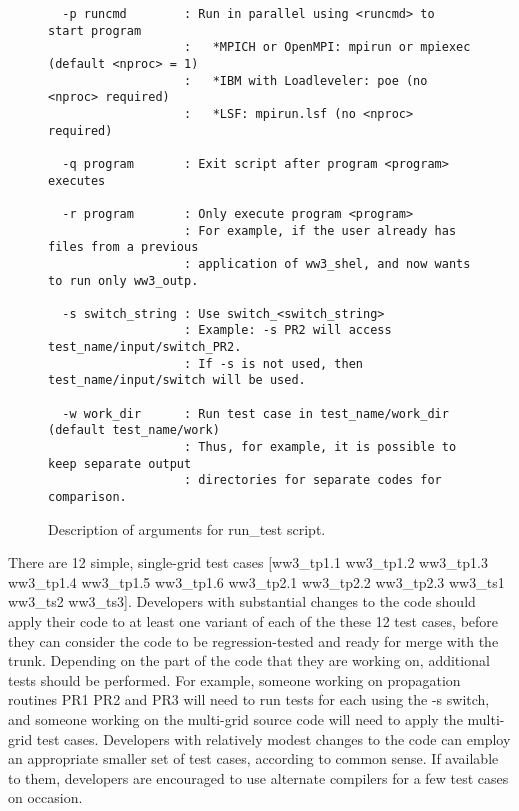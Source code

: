 \documentclass[12pt]{article}
\newcommand{\file}{\sf}
\newcounter{myfigno}[section]
\newenvironment{myfig}[1]{\begin{figure}[#1]
                         \refstepcounter{myfigno}}                       
                        {\end{figure}}
\newcommand{\myfcap}[1]{\begin{list}{\ff Fig. \themyfigno\ :~\hfill}
                       {\rightmargin 8mm \labelsep 0mm
                        \labelwidth 8mm \leftmargin 8mm
                        \topsep 0mm \parskip 0mm \partopsep 0mm }
                        \item \ff #1 \end{list}}
\renewcommand{\themyfigno}{\thesection.\arabic{myfigno}}
\begin{document}
\begin{myfig}{tbp}
\begin{center}
\begin{minipage}[c]{4.5in}
{\begin{verbatim}
  -p runcmd        : Run in parallel using <runcmd> to start program
                   :   *MPICH or OpenMPI: mpirun or mpiexec (default <nproc> = 1)
                   :   *IBM with Loadleveler: poe (no <nproc> required)
                   :   *LSF: mpirun.lsf (no <nproc> required)

  -q program       : Exit script after program <program> executes

  -r program       : Only execute program <program>
                   : For example, if the user already has files from a previous
                   : application of ww3_shel, and now wants to run only ww3_outp.

  -s switch_string : Use switch_<switch_string>
                   : Example: -s PR2 will access test_name/input/switch_PR2.
                   : If -s is not used, then test_name/input/switch will be used.

  -w work_dir      : Run test case in test_name/work_dir (default test_name/work)
                   : Thus, for example, it is possible to keep separate output
                   : directories for separate codes for comparison.

\end{verbatim}}
\end{minipage}
\end{center}
\myfcap{Description of arguments for {\file run\_test} script.}
\label{fig:run_test}
\end{myfig}

There are 12 simple, single-grid test cases [{\file ww3\_tp1.1 ww3\_tp1.2 ww3\_tp1.3
ww3\_tp1.4 ww3\_tp1.5 ww3\_tp1.6 ww3\_tp2.1 ww3\_tp2.2 ww3\_tp2.3 ww3\_ts1
ww3\_ts2 ww3\_ts3}]. Developers with substantial changes to the code should
apply their code to at least one variant of each of the these 12 test cases,
before they can consider the code to be regression-tested and ready for merge
with the trunk. Depending on the part of the code that they are working on,
additional tests should be performed. For example, someone working on
propagation routines PR1 PR2 and PR3 will need to run tests for each using the
-s switch, and someone working on the multi-grid source code will need to
apply the multi-grid test cases. Developers with relatively modest changes
to the code can employ an appropriate smaller set of test cases, according
to common sense. If available to them, developers are encouraged to use alternate
compilers for a few test cases on occasion.
\end{document}
